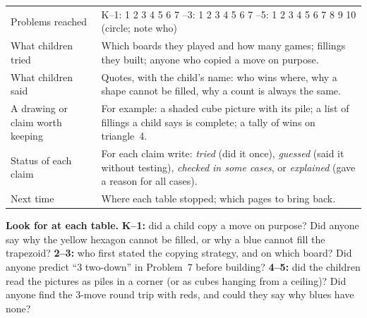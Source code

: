 \documentclass[10pt]{article}
\begin{document}
{\small
\begin{xltabular}{\linewidth}{L{2.0in} Y}
\toprule
Problems reached & K--1: 1 2 3 4 5 6 7 --3: 1 2 3 4 5 6 7 --5: 1 2 3 4 5 6 7 8 9 10 (circle; note who)\\
What children tried & Which boards they played and how many games; fillings they built; anyone who copied a move on purpose.\\
What children said & Quotes, with the child's name: who wins where, why a shape cannot be filled, why a count is always the same.\\
A drawing or claim worth keeping & For example: a shaded cube picture with its pile; a list of fillings a child says is complete; a tally of wins on triangle~4.\\
Status of each claim & For each claim write: \emph{tried} (did it once), \emph{guessed} (said it without testing), \emph{checked in some cases}, or \emph{explained} (gave a reason for all cases).\\
Next time & Where each table stopped; which pages to bring back.\\
\bottomrule
\end{xltabular}
}

\textbf{Look for at each table.}
\textbf{K--1:} did a child copy a move on purpose? Did anyone say why the yellow hexagon cannot be filled, or why a blue cannot fill the trapezoid?
\textbf{2--3:} who first stated the copying strategy, and on which board? Did anyone predict ``3 two-down'' in Problem~7 before building?
\textbf{4--5:} did the children read the pictures as piles in a corner (or as cubes hanging from a ceiling)? Did anyone find the 3-move round trip with reds, and could they say why blues have none?
\end{document}
